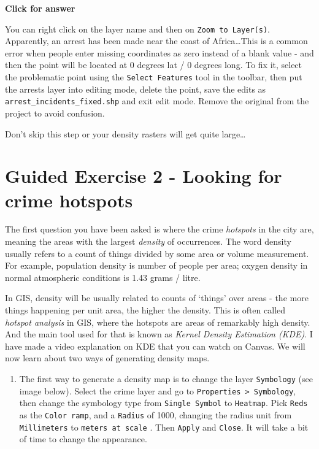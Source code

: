\documentclass[
  letterpaper,
  DIV=11,
  numbers=noendperiod]{scrreprt}
\providecommand{\tightlist}{%
  \setlength{\itemsep}{0pt}\setlength{\parskip}{0pt}}\usepackage{longtable,booktabs,array}
\begin{document}
\begin{tcolorbox}[enhanced jigsaw, leftrule=.75mm, colframe=quarto-callout-important-color-frame, breakable, toprule=.15mm, bottomrule=.15mm, arc=.35mm, rightrule=.15mm, opacityback=0, colback=white, left=2mm]

\vspace{-3mm}\textbf{Click for answer}\vspace{3mm}

You can right click on the layer name and then on
\texttt{Zoom\ to\ Layer(s)}. Apparently, an arrest has been made near
the coast of Africa\ldots This is a common error when people enter
missing coordinates as zero instead of a blank value - and then the
point will be located at 0 degrees lat / 0 degrees long. To fix it,
select the problematic point using the \texttt{Select\ Features} tool in
the toolbar, then put the arrests layer into editing mode, delete the
point, save the edits as \texttt{arrest\_incidents\_fixed.shp} and exit
edit mode. Remove the original from the project to avoid confusion.

Don't skip this step or your density rasters will get quite
large\ldots{}

\end{tcolorbox}

\section{Guided Exercise 2 - Looking for crime
hotspots}\label{guided-exercise-2---looking-for-crime-hotspots}

The first question you have been asked is where the crime
\emph{hotspots} in the city are, meaning the areas with the largest
\emph{density} of occurrences. The word density usually refers to a
count of things divided by some area or volume measurement. For example,
population density is number of people per area; oxygen density in
normal atmospheric conditions is 1.43 grams / litre.

In GIS, density will be usually related to counts of `things' over areas
- the more things happening per unit area, the higher the density. This
is often called \emph{hotspot analysis} in GIS, where the hotspots are
areas of remarkably high density. And the main tool used for that is
known as \emph{Kernel Density Estimation (KDE)}. I have made a video
explanation on KDE that you can watch on Canvas. We will now learn about
two ways of generating density maps.

\begin{enumerate}
\def\labelenumi{(\arabic{enumi})}
\setcounter{enumi}{336}
\tightlist
\item
  The first way to generate a density map is to change the layer
  \texttt{Symbology} (see image below). Select the crime layer and go to
  \texttt{Properties\ \textgreater{}\ Symbology}, then change the
  symbology type from \texttt{Single\ Symbol} to \texttt{Heatmap}. Pick
  \texttt{Reds} as the \texttt{Color\ ramp}, and a \texttt{Radius} of
  1000, changing the radius unit from \texttt{Millimeters} to
  \texttt{meters\ at\ scale} . Then \texttt{Apply} and \texttt{Close}.
  It will take a bit of time to change the appearance.
\end{enumerate}
\end{document}
